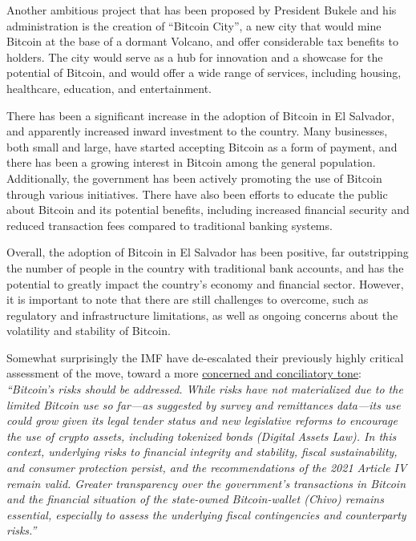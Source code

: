 Another ambitious project that has been proposed by President Bukele and his administration is the creation of ``Bitcoin City'', a new city that would mine Bitcoin at the base of a dormant Volcano, and offer considerable tax benefits to holders. The city would serve as a hub for innovation and a showcase for the potential of Bitcoin, and would offer a wide range of services, including housing, healthcare, education, and entertainment.\par
There has been a significant increase in the adoption of Bitcoin in El Salvador, and apparently increased inward investment to the country. Many businesses, both small and large, have started accepting Bitcoin as a form of payment, and there has been a growing interest in Bitcoin among the general population. Additionally, the government has been actively promoting the use of Bitcoin through various initiatives. There have also been efforts to educate the public about Bitcoin and its potential benefits, including increased financial security and reduced transaction fees compared to traditional banking systems.\par
Overall, the adoption of Bitcoin in El Salvador has been positive, far outstripping the number of people in the country with traditional bank accounts, and has the potential to greatly impact the country's economy and financial sector. However, it is important to note that there are still challenges to overcome, such as regulatory and infrastructure limitations, as well as ongoing concerns about the volatility and stability of Bitcoin.\par 
Somewhat surprisingly the IMF have de-escalated their previously highly critical assessment of the move, toward a more \href{https://www.imf.org/en/News/Articles/2023/02/10/el-salvador-staff-concluding-statement-of-the-2023-article-iv-mission}{concerned and conciliatory tone}:
\textit{``Bitcoin’s risks should be addressed. While risks have not materialized due to the limited Bitcoin use so far—as suggested by survey and remittances data—its use could grow given its legal tender status and new legislative reforms to encourage the use of crypto assets, including tokenized bonds (Digital Assets Law). In this context, underlying risks to financial integrity and stability, fiscal sustainability, and consumer protection persist, and the recommendations of the 2021 Article IV remain valid. Greater transparency over the government's transactions in Bitcoin and the financial situation of the state-owned Bitcoin-wallet (Chivo) remains essential, especially to assess the underlying fiscal contingencies and counterparty risks.''}\par
